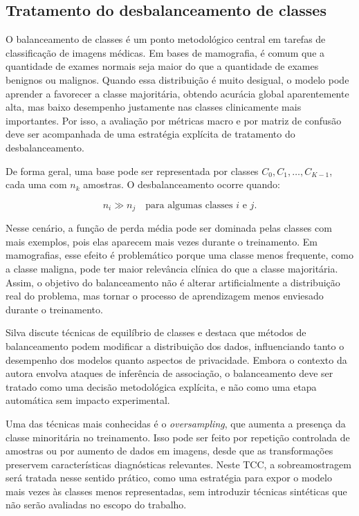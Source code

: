 \documentclass[
    12pt,
    openright,
    oneside,
    a4paper,
    english,
    brazil
]{abntex2}
\begin{document}
\subsection{Tratamento do desbalanceamento de classes}
\label{subsec:tratamento_desbalanceamento_classes}

O balanceamento de classes é um ponto metodológico central em tarefas de classificação de imagens médicas. Em bases de mamografia, é comum que a quantidade de exames normais seja maior do que a quantidade de exames benignos ou malignos. Quando essa distribuição é muito desigual, o modelo pode aprender a favorecer a classe majoritária, obtendo acurácia global aparentemente alta, mas baixo desempenho justamente nas classes clinicamente mais importantes. Por isso, a avaliação por métricas macro e por matriz de confusão deve ser acompanhada de uma estratégia explícita de tratamento do desbalanceamento.

De forma geral, uma base pode ser representada por classes \(C_0, C_1, \ldots, C_{K-1}\), cada uma com \(n_k\) amostras. O desbalanceamento ocorre quando:

\[
n_i \gg n_j
\quad \text{para algumas classes } i \text{ e } j.
\]

Nesse cenário, a função de perda média pode ser dominada pelas classes com mais exemplos, pois elas aparecem mais vezes durante o treinamento. Em mamografias, esse efeito é problemático porque uma classe menos frequente, como a classe maligna, pode ter maior relevância clínica do que a classe majoritária. Assim, o objetivo do balanceamento não é alterar artificialmente a distribuição real do problema, mas tornar o processo de aprendizagem menos enviesado durante o treinamento.

Silva \cite{silva2025balanceamento} discute técnicas de equilíbrio de classes e destaca que métodos de balanceamento podem modificar a distribuição dos dados, influenciando tanto o desempenho dos modelos quanto aspectos de privacidade. Embora o contexto da autora envolva ataques de inferência de associação, o balanceamento deve ser tratado como uma decisão metodológica explícita, e não como uma etapa automática sem impacto experimental.

Uma das técnicas mais conhecidas é o \textit{oversampling}, que aumenta a presença da classe minoritária no treinamento. Isso pode ser feito por repetição controlada de amostras ou por aumento de dados em imagens, desde que as transformações preservem características diagnósticas relevantes. Neste TCC, a sobreamostragem será tratada nesse sentido prático, como uma estratégia para expor o modelo mais vezes às classes menos representadas, sem introduzir técnicas sintéticas que não serão avaliadas no escopo do trabalho.
\end{document}
